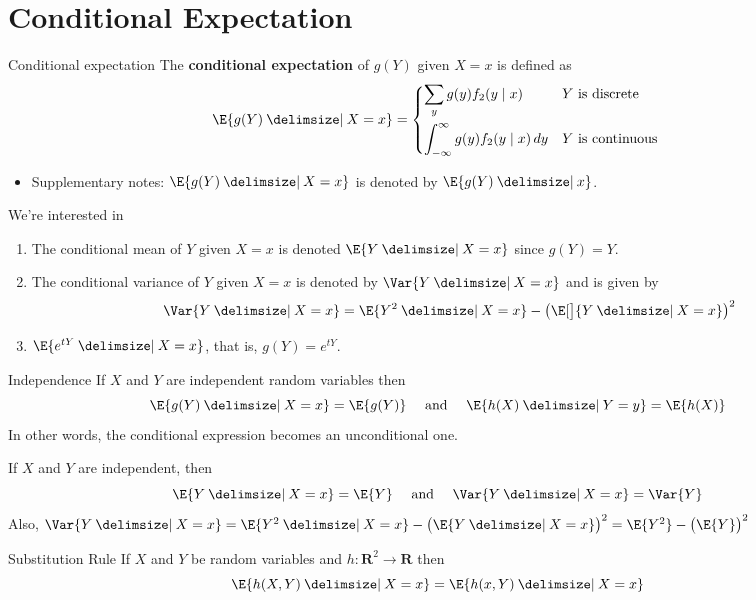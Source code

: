 \section{Conditional Expectation}
\begin{Definition}{Conditional expectation}{}
    The \textbf{conditional expectation} of $ g(Y) $
    given $ X=x $ is defined as
    \[ \E{g(Y)\given X=x}=
        \begin{dcases*}
            \sum_{y}g(y)f_2(y\mid x)                        & $Y$ is discrete   \\
            \int_{-\infty}^{\infty} g(y)f_2(y\mid x)\, d{y} & $Y$ is continuous
        \end{dcases*} \]
\end{Definition}
\begin{Remark}{}{}
    \begin{itemize}
        \item Supplementary notes: $ \E{g(Y)\given X=x} $
              is denoted by $ \E{g(Y)\given x} $.
    \end{itemize}
    We're interested in
    \begin{enumerate}
        \item The conditional mean of $ Y $ given $ X=x $
              is denoted $ \E{Y\given X=x} $ since $ g(Y)=Y $.
        \item The conditional variance of $ Y $ given $ X=x $
              is denoted by $ \Var{Y\given X=x} $ and is given by
              \[ \Var{Y\given X=x}=\E{Y^2\given X=x}-\bigl( \E[\big]{Y\given X=x} \bigr)^2 \]
        \item $ \E{e^{tY}\given X=x} $, that is, $ g(Y)=e^{tY} $.
    \end{enumerate}
\end{Remark}
\begin{Theorem}{Independence}{}
    If $ X $ and $ Y $ are independent random variables then
    \[ \E{g(Y)\given X=x}=\E{g(Y)}\quad\text{ and }\quad\E{h(X)\given Y=y}=\E{h(X)} \]
    In other words, the conditional expression becomes an unconditional one.
\end{Theorem}
\begin{Example}{}{}
    If $ X $ and $ Y $ are independent, then
    \[ \E{Y\given X=x}=\E{Y}\quad\text{ and }\quad \Var{Y\given X=x}=\Var{Y} \]
    Also, $ \Var{Y\given X=x}=\E{Y^2\given X=x}-\bigl( \E{Y\given X=x} \bigr)^2=
        \E{Y^2}-\bigl( \E{Y} \bigr)^2 $
\end{Example}
\begin{Theorem}{Substitution Rule}{}
    If $ X $ and $ Y $
    be random variables and $ h:\mathbf{R}^2\to \mathbf{R} $ then
    \[ \E{h(X,Y)\given X=x}=\E{h(x,Y)\given X=x} \]
\end{Theorem}
